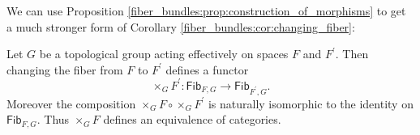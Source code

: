     \needspace{4cm}

    We can use Proposition \ref{fiber_bundles:prop:construction_of_morphisms} to get a much stronger form of Corollary \ref{fiber_bundles:cor:changing_fiber}:

    \begin{theorem}
        \label{fiber_bundles:thm:change_of_fiber_functor}
        Let $G$ be a topological group acting effectively on spaces $F$ and $F^\prime$. Then changing the fiber from $F$ to $F^\prime$ defines a functor 
        \[
        \times_G F^\prime \colon \mathsf{Fib}_{F,G} \to \mathsf{Fib}_{F^\prime,G}.
        \]
        Moreover the composition $\times_G F \circ \times_G F^\prime$ is naturally isomorphic to the identity on $\mathsf{Fib}_{F,G}$. Thus $\times_G F$ defines an equivalence of categories.
    \end{theorem}

